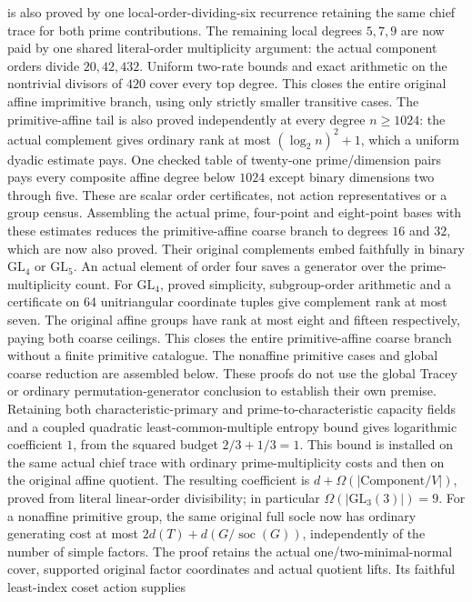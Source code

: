is also proved by one local-order-dividing-six recurrence retaining
the same chief trace for both prime contributions. The remaining local
degrees $5,7,9$ are now paid by one shared literal-order multiplicity
argument: the actual component orders divide $20,42,432$. Uniform
two-rate bounds and exact arithmetic on the nontrivial divisors of $420$
cover every top degree. This closes the entire original affine
imprimitive branch, using only strictly smaller transitive cases.
The primitive-affine tail is also proved independently at every degree
$n\geq1024$: the actual complement gives ordinary rank at most
$(\log_2 n)^2+1$, which a uniform dyadic estimate pays. One checked table
of twenty-one prime/dimension pairs pays every composite affine degree
below $1024$ except binary dimensions two through five. These are scalar
order certificates, not action representatives or a group census.
Assembling the actual prime, four-point and eight-point bases with these
estimates reduces the primitive-affine coarse branch to degrees $16$ and
$32$, which are now also proved. Their original complements embed faithfully
in binary $\mathrm{GL}_4$ or $\mathrm{GL}_5$. An actual element of order four
saves a generator over the prime-multiplicity count. For $\mathrm{GL}_4$,
proved simplicity, subgroup-order arithmetic and a certificate on 64
unitriangular coordinate tuples give complement rank at most seven.
The original affine groups have rank at most eight and fifteen respectively,
paying both coarse ceilings. This closes the entire primitive-affine coarse
branch without a finite primitive catalogue.
The nonaffine primitive cases and global coarse reduction are assembled
below. These proofs do not use the global Tracey or ordinary
permutation-generator conclusion to establish their own premise.
Retaining both characteristic-primary and prime-to-characteristic
capacity fields and a coupled quadratic least-common-multiple entropy
bound gives logarithmic coefficient $1$, from the squared budget
$2/3+1/3=1$. This bound is installed on the same
actual chief trace with ordinary prime-multiplicity costs and then on
the original affine quotient. The resulting coefficient is
$d+\Omega(|\mathrm{Component}/V|)$, proved from literal linear-order
divisibility; in particular $\Omega(|\mathrm{GL}_3(3)|)=9$.
For a nonaffine primitive group, the same original full socle now
has ordinary generating cost at most $2d(T)+d(G/\operatorname{soc}(G))$,
independently of the number of simple factors. The proof retains the
actual one/two-minimal-normal cover, supported original factor coordinates
and actual quotient lifts. Its faithful least-index coset action supplies
